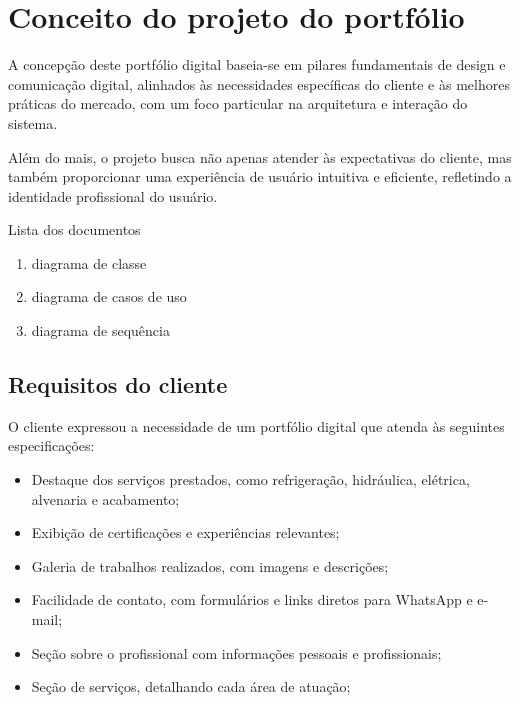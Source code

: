 \chapter{Conceito do projeto do portfólio}
\label{chap:fundteor}
A concepção deste portfólio digital baseia-se em pilares fundamentais de design e comunicação digital, alinhados às necessidades específicas do cliente e às melhores práticas do mercado, com um foco particular na arquitetura e interação do sistema.

Além do mais, o projeto busca não apenas atender às expectativas do cliente, mas também proporcionar uma experiência de usuário intuitiva e eficiente, refletindo a identidade profissional do usuário.


Lista dos documentos
\begin{enumerate}
   \item diagrama de classe
   \item diagrama de casos de uso
   \item diagrama de sequência
\end{enumerate}


\section{Requisitos do cliente}
O cliente expressou a necessidade de um portfólio digital que atenda às seguintes especificações:
 \begin{itemize}
    \item Destaque dos serviços prestados, como refrigeração, hidráulica, elétrica, alvenaria e acabamento;
    \item Exibição de certificações e experiências relevantes;
    \item Galeria de trabalhos realizados, com imagens e descrições;
    \item Facilidade de contato, com formulários e links diretos para WhatsApp e e-mail;
    \item Seção sobre o profissional com informações pessoais e profissionais;
    \item Seção de serviços, detalhando cada área de atuação;
 \end{itemize}

